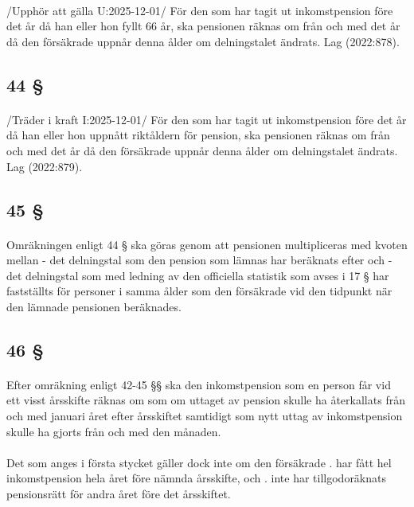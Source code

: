 \documentclass[a4paper,notitlepage,openany,10pt]{book}
\begin{document}
\paragraph*{}
/Upphör att gälla U:2025-12-01/
För den som har tagit ut inkomstpension före det år då han eller hon fyllt 66 år, ska pensionen räknas om från och med det år då den försäkrade uppnår denna ålder om delningstalet ändrats.
Lag (2022:878).
\subsection*{44 §}
\paragraph*{}
/Träder i kraft I:2025-12-01/
För den som har tagit ut inkomstpension före det år då han eller hon uppnått riktåldern för pension, ska pensionen räknas om från och med det år då den försäkrade uppnår denna ålder om delningstalet ändrats.
Lag (2022:879).
\subsection*{45 §}
\paragraph*{}
Omräkningen enligt 44 § ska göras genom att pensionen multipliceras med kvoten mellan
\newline - det delningstal som den pension som lämnas har beräknats efter och
\newline - det delningstal som med ledning av den officiella statistik som avses i 17 § har fastställts för personer i samma ålder som den försäkrade vid den tidpunkt när den lämnade pensionen beräknades.
\subsection*{46 §}
\paragraph*{}
Efter omräkning enligt 42-45 §§ ska den inkomstpension som en person får vid ett visst årsskifte räknas om som om uttaget av pension skulle ha återkallats från och med januari året efter årsskiftet samtidigt som nytt uttag av inkomstpension skulle ha gjorts från och med den månaden.
\paragraph*{}
Det som anges i första stycket gäller dock inte om den försäkrade
. har fått hel inkomstpension hela året före nämnda årsskifte, och
. inte har tillgodoräknats pensionsrätt för andra året före det årsskiftet.
\end{document}
